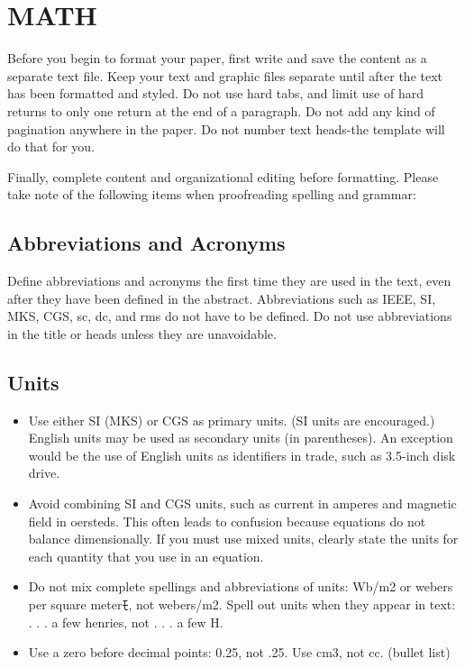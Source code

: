 \section{MATH}

Before you begin to format your paper, first write and save the content as a separate text file. Keep your text and graphic files separate until after the text has been formatted and styled. Do not use hard tabs, and limit use of hard returns to only one return at the end of a paragraph. Do not add any kind of pagination anywhere in the paper. Do not number text heads-the template will do that for you.

Finally, complete content and organizational editing before formatting. Please take note of the following items when proofreading spelling and grammar:

\subsection{Abbreviations and Acronyms} Define abbreviations and acronyms the first time they are used in the text, even after they have been defined in the abstract. Abbreviations such as IEEE, SI, MKS, CGS, sc, dc, and rms do not have to be defined. Do not use abbreviations in the title or heads unless they are unavoidable.

\subsection{Units}

\begin{itemize}

\item Use either SI (MKS) or CGS as primary units. (SI units are encouraged.) English units may be used as secondary units (in parentheses). An exception would be the use of English units as identifiers in trade, such as 3.5-inch disk drive.
\item Avoid combining SI and CGS units, such as current in amperes and magnetic field in oersteds. This often leads to confusion because equations do not balance dimensionally. If you must use mixed units, clearly state the units for each quantity that you use in an equation.
\item Do not mix complete spellings and abbreviations of units: Wb/m2 or webers per square meterﾓ, not webers/m2.  Spell out units when they appear in text: . . . a few henries, not . . . a few H.
\item Use a zero before decimal points: 0.25, not .25. Use cm3, not cc. (bullet list)

\end{itemize}


